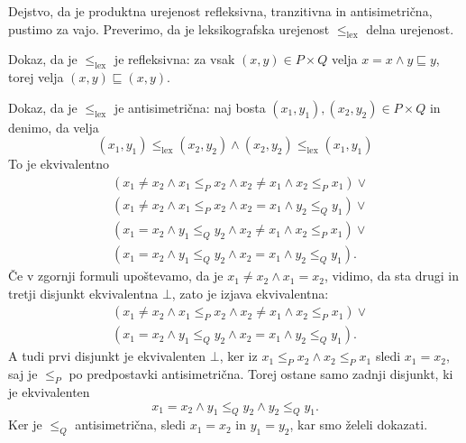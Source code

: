 \begin{dokaz}
  Dejstvo, da je produktna urejenost refleksivna, tranzitivna in antisimetrična, pustimo za vajo. Preverimo, da je leksikografska urejenost $\leq_\mathrm{lex}$ delna urejenost.

  Dokaz, da je $\leq_\mathrm{lex}$ je refleksivna: za vsak $(x, y) \in P \times Q$ velja $x = x \land y \sqsubseteq y$, torej velja $(x, y) \sqsubseteq (x, y)$.

  Dokaz, da je $\leq_\mathrm{lex}$ je antisimetrična: naj bosta $(x_1,y_1), (x_2,y_2) \in P \times Q$ in denimo, da velja
  \begin{equation*}
    (x_1, y_1) \leq_\mathrm{lex} (x_2, y_2) \land (x_2, y_2) \leq_\mathrm{lex} (x_1, y_1)
  \end{equation*}
  To je ekvivalentno
  \begin{align*}
  & (x_1 \neq x_2 \land x_1 \leq_P x_2 \land x_2 \neq x_1 \land x_2 \leq_P x_1) \lor {}\\
  & (x_1 \neq x_2 \land x_1 \leq_P x_2 \land x_2 = x_1 \land y_2 \leq_Q y_1) \lor {}\\
  & (x_1 = x_2 \land y_1 \leq_Q y_2 \land x_2 \neq x_1 \land x_2 \leq_P x_1) \lor {}\\
  & (x_1 = x_2 \land y_1 \leq_Q y_2 \land x_2 = x_1 \land y_2 \leq_Q y_1).
  \end{align*}
  Če v zgornji formuli upoštevamo, da je $x_1 \neq x_2 \land x_1 = x_2$, vidimo, da sta drugi in tretji disjunkt ekvivalentna $\bot$, zato
  je izjava ekvivalentna:
  \begin{align*}
  &(x_1 \neq x_2 \land x_1 \leq_P x_2 \land x_2 \neq x_1 \land x_2 \leq_P x_1) \lor {}\\
  &(x_1 = x_2 \land y_1 \leq_Q y_2 \land x_2 = x_1 \land y_2 \leq_Q y_1).
  \end{align*}
  A tudi prvi disjunkt je ekvivalenten $\bot$, ker iz $x_1 \leq_P x_2 \land x_2 \leq_P x_1$ sledi $x_1 = x_2$, saj je $\leq_P$ po predpostavki antisimetrična. Torej ostane samo zadnji disjunkt, ki je ekvivalenten
  \begin{equation*}
    x_1 = x_2 \land y_1 \leq_Q y_2 \land y_2 \leq_Q y_1.
  \end{equation*}
  Ker je $\leq_Q$ antisimetrična, sledi $x_1 = x_2$ in $y_1 = y_2$, kar smo želeli dokazati.


\end{dokaz}
